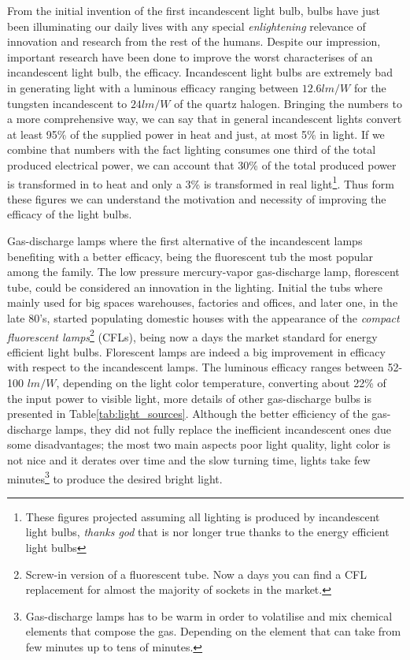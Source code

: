 From the initial invention of the first incandescent light bulb,  bulbs have just been illuminating our daily lives with any special \emph{enlightening} relevance of innovation and research from the rest of the humans. Despite our impression,  important research have been done to improve the worst characterises of an incandescent light bulb, the efficacy. Incandescent light bulbs are extremely bad in generating light with a luminous efficacy ranging between $12.6 lm/W$ for the tungsten incandescent to $24 lm/W$ of the quartz halogen. Bringing the numbers to a more comprehensive way, we can say that in general incandescent lights convert at least 95\% of the supplied power in heat and just, at most 5\% in light. If we combine that numbers with the fact lighting consumes one third of the total produced electrical power, we can account that 30\% of the total produced power is transformed in to heat and only a 3\% is transformed in real light\footnote{These figures projected assuming all lighting is produced by incandescent light bulbs, \emph{thanks god} that is nor longer true thanks to the energy efficient light  bulbs}. Thus form these figures we can understand  the motivation and necessity of improving the efficacy of the light bulbs.

Gas-discharge lamps where the first alternative of the incandescent lamps benefiting with a better efficacy, being the fluorescent tub the most popular among the family. The low pressure mercury-vapor gas-discharge  lamp, florescent tube, could be considered an innovation in the lighting. Initial the tubs where mainly used for big spaces warehouses, factories and offices, and later one, in the late 80's, started populating domestic houses with the appearance of the \emph{compact fluorescent lamps}\footnote{Screw-in version of a fluorescent tube. Now a days you can find a CFL replacement for almost the majority of sockets in the market.} (CFLs), being now a days the market standard for energy efficient light bulbs. Florescent lamps are indeed a big improvement in efficacy with respect to the incandescent lamps. The luminous efficacy ranges between 52-100 $lm/W$, depending on the light color temperature, converting about 22\% of the input power to visible light, more details of other gas-discharge bulbs is presented in Table\ref{tab:light_sources}. Although the better efficiency of the gas-discharge lamps, they did not fully replace the inefficient incandescent ones due some disadvantages; the most two main aspects poor light quality, light color is not nice and it derates over time and the slow turning time, lights take few minutes\footnote{Gas-discharge lamps has to be warm in order to volatilise and mix chemical elements that compose the gas. Depending on the element that can take from few minutes up to tens of minutes. } to produce the desired bright light.


